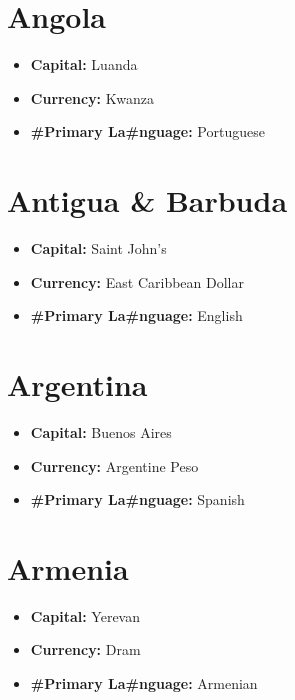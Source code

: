\documentclass[a4paper,twoside]{book}
\begin{document}
\section*{\Huge Angola}
\vspace{5mm} %
\begin{itemize}
	\item \textbf{Capital:} Luanda
	\item \textbf{Currency:} Kwanza
	\item \textbf{\#Primary La\#nguage:} Portuguese
\end{itemize}

\section*{\Huge Antigua \& Barbuda}
\vspace{5mm} %
\begin{itemize}
	\item \textbf{Capital:} Saint John's
	\item \textbf{Currency:} East Caribbean Dollar
	\item \textbf{\#Primary La\#nguage:} English
\end{itemize}

\section*{\Huge Argentina}
\vspace{5mm} %
\begin{itemize}
	\item \textbf{Capital:} Buenos Aires
	\item \textbf{Currency:} Argentine Peso
	\item \textbf{\#Primary La\#nguage:} Spanish
\end{itemize}

\section*{\Huge Armenia}
\vspace{5mm} %
\begin{itemize}
	\item \textbf{Capital:} Yerevan
	\item \textbf{Currency:} Dram
	\item \textbf{\#Primary La\#nguage:} Armenian
\end{itemize}
\end{document}
